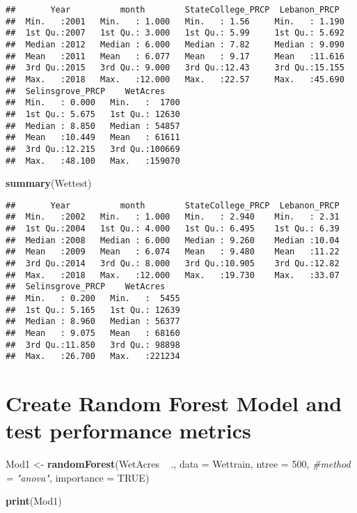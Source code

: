 \documentclass[]{article}
\newenvironment{Shaded}{\begin{snugshade}}{\end{snugshade}}
\newcommand{\KeywordTok}[1]{\textcolor[rgb]{0.13,0.29,0.53}{\textbf{{#1}}}}
\newcommand{\DataTypeTok}[1]{\textcolor[rgb]{0.13,0.29,0.53}{{#1}}}
\newcommand{\DecValTok}[1]{\textcolor[rgb]{0.00,0.00,0.81}{{#1}}}
\newcommand{\StringTok}[1]{\textcolor[rgb]{0.31,0.60,0.02}{{#1}}}
\newcommand{\CommentTok}[1]{\textcolor[rgb]{0.56,0.35,0.01}{\textit{{#1}}}}
\newcommand{\OtherTok}[1]{\textcolor[rgb]{0.56,0.35,0.01}{{#1}}}
\newcommand{\NormalTok}[1]{{#1}}
\begin{document}
\begin{verbatim}
##       Year          month        StateCollege_PRCP  Lebanon_PRCP   
##  Min.   :2001   Min.   : 1.000   Min.   : 1.56     Min.   : 1.190  
##  1st Qu.:2007   1st Qu.: 3.000   1st Qu.: 5.99     1st Qu.: 5.692  
##  Median :2012   Median : 6.000   Median : 7.82     Median : 9.090  
##  Mean   :2011   Mean   : 6.077   Mean   : 9.17     Mean   :11.616  
##  3rd Qu.:2015   3rd Qu.: 9.000   3rd Qu.:12.43     3rd Qu.:15.155  
##  Max.   :2018   Max.   :12.000   Max.   :22.57     Max.   :45.690  
##  Selinsgrove_PRCP    WetAcres     
##  Min.   : 0.000   Min.   :  1700  
##  1st Qu.: 5.675   1st Qu.: 12630  
##  Median : 8.850   Median : 54857  
##  Mean   :10.449   Mean   : 61611  
##  3rd Qu.:12.215   3rd Qu.:100669  
##  Max.   :48.100   Max.   :159070
\end{verbatim}

\begin{Shaded}
\begin{Highlighting}[]
\KeywordTok{summary}\NormalTok{(Wettest)}
\end{Highlighting}
\end{Shaded}

\begin{verbatim}
##       Year          month        StateCollege_PRCP  Lebanon_PRCP  
##  Min.   :2002   Min.   : 1.000   Min.   : 2.940    Min.   : 2.31  
##  1st Qu.:2004   1st Qu.: 4.000   1st Qu.: 6.495    1st Qu.: 6.39  
##  Median :2008   Median : 6.000   Median : 9.260    Median :10.04  
##  Mean   :2009   Mean   : 6.074   Mean   : 9.480    Mean   :11.22  
##  3rd Qu.:2014   3rd Qu.: 8.000   3rd Qu.:10.905    3rd Qu.:12.82  
##  Max.   :2018   Max.   :12.000   Max.   :19.730    Max.   :33.07  
##  Selinsgrove_PRCP    WetAcres     
##  Min.   : 0.200   Min.   :  5455  
##  1st Qu.: 5.165   1st Qu.: 12639  
##  Median : 8.960   Median : 56377  
##  Mean   : 9.075   Mean   : 68160  
##  3rd Qu.:11.850   3rd Qu.: 98898  
##  Max.   :26.700   Max.   :221234
\end{verbatim}

\section{Create Random Forest Model and test performance
metrics}\label{create-random-forest-model-and-test-performance-metrics}

\begin{Shaded}
\begin{Highlighting}[]
\NormalTok{Mod1 <-}\StringTok{ }\KeywordTok{randomForest}\NormalTok{(WetAcres ~}\StringTok{ }\NormalTok{., }
                     \DataTypeTok{data =} \NormalTok{Wettrain, }
                     \DataTypeTok{ntree =} \DecValTok{500}\NormalTok{, }
                     \CommentTok{#method = "anova", }
                     \DataTypeTok{importance =} \OtherTok{TRUE}\NormalTok{)}


\KeywordTok{print}\NormalTok{(Mod1)}
\end{Highlighting}
\end{Shaded}
\end{document}
